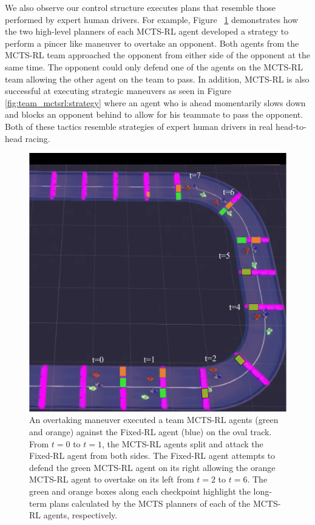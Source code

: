 \begin{enumerate}[wide, labelindent=0pt, font=\bfseries]
We also observe our control structure executes plans that resemble those performed by expert human drivers. For example, Figure~ \ref{fig:team_mctsrl:overtake} demonstrates how the two high-level planners of each MCTS-RL agent developed a strategy to perform a pincer like maneuver to overtake an opponent. Both agents from the MCTS-RL team approached the opponent from either side of the opponent at the same time. The opponent could only defend one of the agents on the MCTS-RL team allowing the other agent on the team to pass. In addition, MCTS-RL is also successful at executing strategic maneuvers as seen in Figure~ \ref{fig:team_mctsrl:strategy} where an agent who is ahead momentarily slows down and blocks an opponent behind to allow for his teammate to pass the opponent. Both of these tactics resemble strategies of expert human drivers in real head-to-head racing.
 \end{enumerate}
 
 \begin{figure}
  \centering
  \includegraphics[height=0.7\textheight]{Figures/MCTSRLTeamOvertake.pdf}
  \caption [Overtaking maneuver by team of MCTS-RL agents.] {An overtaking maneuver executed a team MCTS-RL agents (green and orange) against the Fixed-RL agent (blue) on the oval track. From $t=0$ to $t=1$, the MCTS-RL agents split and attack the Fixed-RL agent from both sides. The Fixed-RL agent attempts to defend the green MCTS-RL agent on its right allowing the orange MCTS-RL agent to overtake on its left from $t=2$ to $t=6$. The green and orange boxes along each checkpoint highlight the long-term plans calculated by the MCTS planners of each of the MCTS-RL agents, respectively.}
  \label{fig:team_mctsrl:overtake}
\end{figure}


